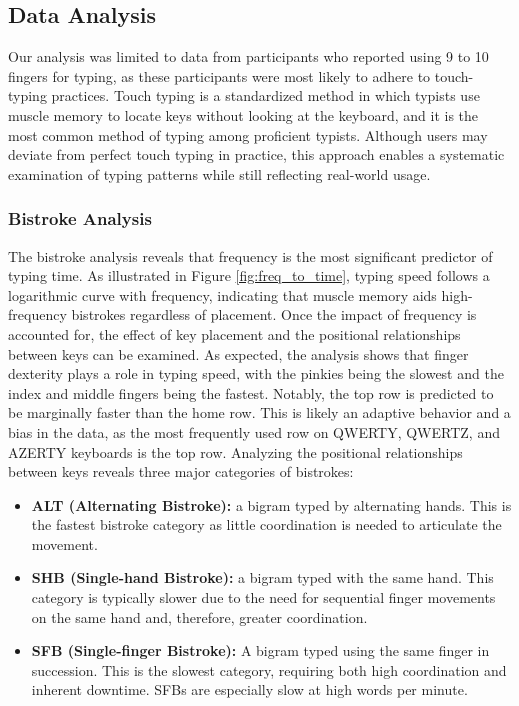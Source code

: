 \subsection{Data Analysis}
Our analysis was limited to data from participants who reported using 9 to 10 fingers for typing, as these participants were most likely to adhere to touch-typing practices. Touch typing is a standardized method in which typists use muscle memory to locate keys without looking at the keyboard, and it is the most common method of typing among proficient typists. Although users may deviate from perfect touch typing in practice, this approach enables a systematic examination of typing patterns while still reflecting real-world usage.

\subsubsection{Bistroke Analysis}
\noindent The bistroke analysis reveals that frequency is the most significant predictor of typing time. As illustrated in Figure \ref{fig:freq_to_time}, typing speed follows a logarithmic curve with frequency, indicating that muscle memory aids high-frequency bistrokes regardless of placement. Once the impact of frequency is accounted for, the effect of key placement and the positional relationships between keys can be examined. As expected, the analysis shows that finger dexterity plays a role in typing speed, with the pinkies being the slowest and the index and middle fingers being the fastest. Notably, the top row is predicted to be marginally faster than the home row. This is likely an adaptive behavior and a bias in the data, as the most frequently used row on QWERTY, QWERTZ, and AZERTY keyboards is the top row. Analyzing the positional relationships between keys reveals three major categories of bistrokes:

\begin{itemize}
  \item \textbf{ALT (Alternating Bistroke):} a bigram typed by alternating hands. This is the fastest bistroke category as little coordination is needed to articulate the movement.
\item \textbf{SHB (Single-hand Bistroke):} a bigram typed with the same hand. This category is typically slower due to the need for sequential finger movements on the same hand and, therefore, greater coordination.
\item \textbf{SFB (Single-finger Bistroke):} A bigram typed using the same finger in succession. This is the slowest category, requiring both high coordination and inherent downtime. SFBs are especially slow at high words per minute.
\end{itemize}

